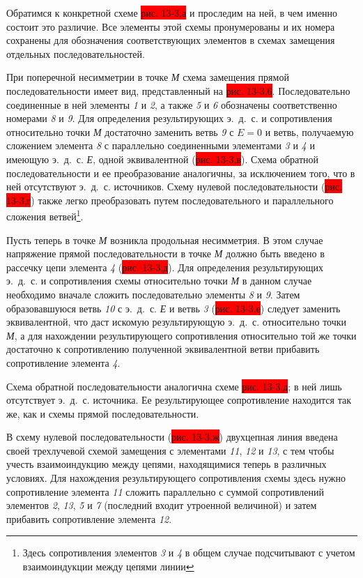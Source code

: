 Обратимся к конкретной схеме \colorbox{red}{рис. 13-3,а} и проследим на ней, в чем именно состоит это различие. Все элементы этой схемы пронумерованы и их номера сохранены для обозначения соответствующих элементов в схемах замещения отдельных последовательностей.

При поперечной несимметрии в точке \textit{М} схема замещения прямой последовательности имеет вид, представленный на \colorbox{red}{рис. 13-3,6}. Последовательно соединенные в ней элементы \textit{1} и \textit{2}, а также \textit{5} и \textit{6} обозначены соответственно номерами \textit{8} и \textit{9}. Для определения результирующих э.~д.~с. и сопротивления относительно точки \textit{М} достаточно заменить ветвь \textit{9} с $ E = 0 $ и ветвь, получаемую сложением элемента \textit{8} с параллельно соединенными элементами \textit{3} и \textit{4} и имеющую э.~д.~с. \textit{Е}, одной эквивалентной (\colorbox{red}{рис. 13-3,в}). Схема обратной последовательности и ее преобразование аналогичны, за исключением того, что в ней отсутствуют э.~д.~с. источников. Схему нулевой последовательности (\colorbox{red}{рис. 13-3,г}) также легко преобразовать путем последовательного и параллельного сложения ветвей\footnote{Здесь сопротивления элементов \textit{3} и \textit{4} в общем случае подсчитывают с учетом взаимоиндукции между цепями линии}.

Пусть теперь в точке \textit{М} возникла продольная несимметрия. В этом случае напряжение прямой последовательности в точке \textit{М} должно быть введено в рассечку цепи элемента \textit{4} (\colorbox{red}{рис. 13-3,д}). Для определения результирующих э.~д.~с. и сопротивления схемы относительно точки \textit{М} в данном случае необходимо вначале сложить последовательно элементы \textit{8} и \textit{9}. Затем образовавшуюся ветвь \textit{10} с э.~д.~с. \textit{Е} и ветвь \textit{3} (\colorbox{red}{рис. 13-3,е}) следует заменить эквивалентной, что даст искомую результирующую э.~д.~с. относительно точки \textit{М}, а для нахождении результирующего сопротивления относительно той же точки достаточно к сопротивлению полученной эквивалентной ветви прибавить сопротивление элемента \textit{4}.

Схема обратной последовательности аналогична схеме \colorbox{red}{рис. 13-3,д}; в ней лишь отсутствует э.~д.~с. источника. Ее результирующее сопротивление находится так же, как и схемы прямой последовательности.

В схему нулевой последовательности (\colorbox{red}{рис. 13-3,ж}) двухцепная линия введена своей трехлучевой схемой замещения с элементами \textit{11}, \textit{12} и \textit{13}, с тем чтобы учесть взаимоиндукцию между цепями, находящимися теперь в различных условиях. Для нахождения результирующего сопротивления схемы здесь нужно сопротивление элемента \textit{11} сложить параллельно с суммой сопротивлений элементов \textit{2}, \textit{13}, \textit{5} и \textit{7} (последний входит утроенной величиной) и затем прибавить сопротивление элемента \textit{12}.

